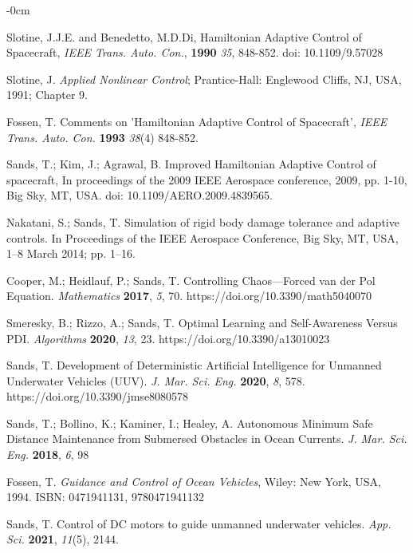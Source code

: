 \documentclass[applsci,article,submit,pdftex,moreauthors]{Definitions/mdpi}
\begin{document}
\begin{adjustwidth}{-\extralength}{0cm}
\begin{thebibliography}{999}
Slotine, J.J.E. and Benedetto, M.D.Di, Hamiltonian Adaptive Control of Spacecraft, {\em IEEE Trans. Auto. Con.}, {\bf 1990} {\em 35}, 848-852. doi: 10.1109/9.57028

Slotine, J. {\em Applied Nonlinear Control}; Prantice-Hall: Englewood Cliffs, NJ, USA, 1991; Chapter 9.

Fossen, T. Comments on 'Hamiltonian Adaptive Control of Spacecraft', {\em IEEE Trans. Auto. Con.} {\bf 1993} {\em 38}(4) 848-852.

Sands, T.; Kim, J.; Agrawal, B. Improved Hamiltonian Adaptive Control of spacecraft, In proceedings of the 2009 IEEE Aerospace conference, 2009, pp. 1-10, Big Sky, MT, USA. doi: 10.1109/AERO.2009.4839565.

Nakatani, S.; Sands, T. Simulation of rigid body damage tolerance and adaptive controls. In Proceedings of the IEEE Aerospace Conference, Big Sky, MT, USA, 1–8 March 2014; pp. 1–16. 

Cooper, M.; Heidlauf, P.; Sands, T. Controlling Chaos—Forced van der Pol Equation. {\em Mathematics} {\bf 2017}, {\em 5}, 70. https://doi.org/10.3390/math5040070

Smeresky, B.; Rizzo, A.; Sands, T. Optimal Learning and Self-Awareness Versus PDI. {\em Algorithms} {\bf 2020}, {\em 13}, 23. https://doi.org/10.3390/a13010023

Sands, T. Development of Deterministic Artificial Intelligence for Unmanned Underwater Vehicles (UUV). {\em J. Mar. Sci. Eng.} {\bf 2020}, {\em 8}, 578. https://doi.org/10.3390/jmse8080578

Sands, T.; Bollino, K.; Kaminer, I.; Healey, A. Autonomous Minimum Safe Distance Maintenance from Submersed Obstacles in Ocean Currents. {\em J. Mar. Sci. Eng.} {\bf 2018}, {\em 6}, 98

Fossen, T. \textit{Guidance and Control of Ocean Vehicles}, Wiley: New York, USA, 1994. ISBN: 0471941131, 9780471941132

Sands, T. Control of DC motors to guide unmanned underwater vehicles. {\em App. Sci.} {\bf 2021}, {\em 11}(5), 2144. 


\end{thebibliography}
\end{adjustwidth}
\end{document}
